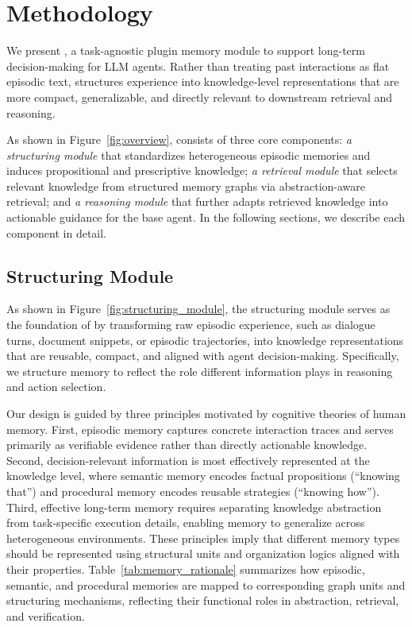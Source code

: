 \section{Methodology}
We present \plugmem, a task-agnostic plugin memory module to support long-term decision-making for LLM agents. Rather than treating past interactions as flat episodic text, \plugmem structures experience into knowledge-level representations that are more compact, generalizable, and directly relevant to downstream retrieval and reasoning.

As shown in Figure~\ref{fig:overview}, \plugmem consists of three core components: \textit{a structuring module} that standardizes heterogeneous episodic memories and induces propositional and prescriptive knowledge; \textit{a retrieval module} that selects relevant knowledge from structured memory graphs via abstraction-aware retrieval; and \textit{a reasoning module} that further adapts retrieved knowledge into actionable guidance for the base agent. In the following sections, we describe each component in detail.

\subsection{Structuring Module}
\label{subsec:structuring}

As shown in Figure~\ref{fig:structuring_module}, the structuring module serves as the foundation of \plugmem by transforming raw episodic experience, such as dialogue turns, document snippets, or episodic trajectories, into knowledge representations that are reusable, compact, and aligned with agent decision-making. Specifically, we structure memory to reflect the role different information plays in reasoning and action selection.


Our design is guided by three principles motivated by cognitive theories of human memory. First, episodic memory captures concrete interaction traces and serves primarily as verifiable evidence rather than directly actionable knowledge. Second, decision-relevant information is most effectively represented at the knowledge level, where semantic memory encodes factual propositions (``knowing that'') and procedural memory encodes reusable strategies (``knowing how''). Third, effective long-term memory requires separating knowledge abstraction from task-specific execution details, enabling memory to generalize across heterogeneous environments. These principles imply that different memory types should be represented using structural units and organization logics aligned with their properties. Table~\ref{tab:memory_rationale} summarizes how episodic, semantic, and procedural memories are mapped to corresponding graph units and structuring mechanisms, reflecting their functional roles in abstraction, retrieval, and verification.

